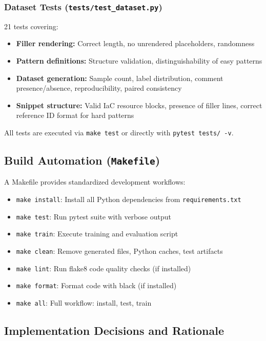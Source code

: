 \subsubsection{Dataset Tests (\texttt{tests/test\_dataset.py})}

21 tests covering:
\begin{itemize}
  \item \textbf{Filler rendering:} Correct length, no unrendered placeholders, randomness
  \item \textbf{Pattern definitions:} Structure validation, distinguishability of easy patterns
  \item \textbf{Dataset generation:} Sample count, label distribution, comment presence/absence, reproducibility, paired consistency
  \item \textbf{Snippet structure:} Valid IaC resource blocks, presence of filler lines, correct reference ID format for hard patterns
\end{itemize}

All tests are executed via \texttt{make test} or directly with \texttt{pytest tests/ -v}.

\subsection{Build Automation (\texttt{Makefile})}

A Makefile provides standardized development workflows:

\begin{itemize}
  \item \texttt{make install}: Install all Python dependencies from \texttt{requirements.txt}
  \item \texttt{make test}: Run pytest suite with verbose output
  \item \texttt{make train}: Execute training and evaluation script
  \item \texttt{make clean}: Remove generated files, Python caches, test artifacts
  \item \texttt{make lint}: Run flake8 code quality checks (if installed)
  \item \texttt{make format}: Format code with black (if installed)
  \item \texttt{make all}: Full workflow: install, test, train
\end{itemize}

\subsection{Implementation Decisions and Rationale}

